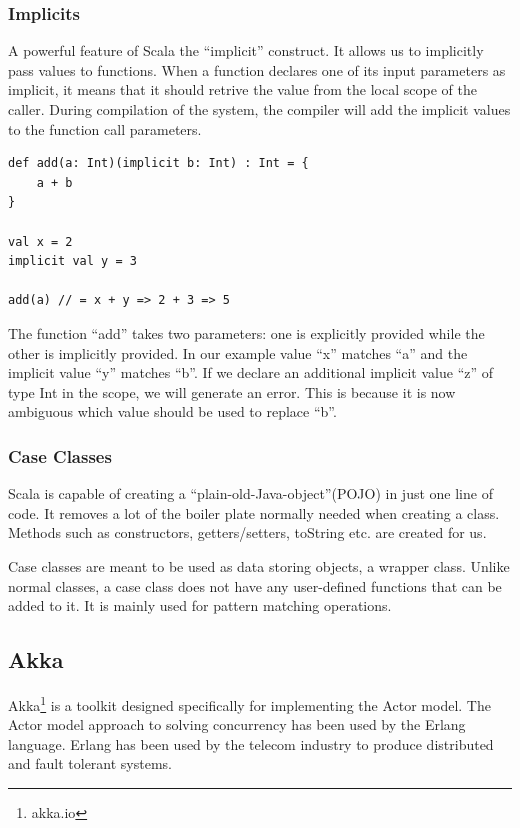 \subsubsection{Implicits}
A powerful feature of Scala the ``implicit'' construct. It allows us to implicitly pass values to functions. When a function declares one of its input parameters as implicit, it means that it should retrive the value from the local scope of the caller. During compilation of the system, the compiler will add the implicit values to the function call parameters.

\begin{lstlisting}[style=myScalastyle]
def add(a: Int)(implicit b: Int) : Int = {
    a + b
}

val x = 2
implicit val y = 3

add(a) // = x + y => 2 + 3 => 5
\end{lstlisting}
The function ``add'' takes two parameters: one is explicitly provided while the other is implicitly provided. In our example value ``x'' matches ``a'' and the implicit value ``y'' matches  ``b''. If we declare an additional implicit value ``z'' of type Int in the scope, we will generate an error. This is because it is now ambiguous which value should be used to replace ``b''. 

\subsubsection{Case Classes}
Scala is capable of creating a ``plain-old-Java-object''(POJO) in just one line of code. It removes a lot of the boiler plate normally needed when creating a class. Methods such as constructors, getters/setters, toString etc. are created for us.

Case classes are meant to be used as data storing objects, a wrapper class. Unlike normal classes, a case class does not have any user-defined functions that can be added to it. It is mainly used for pattern matching operations.

\subsection{Akka} 
Akka\footnote{akka.io}\cite{akka-documentation} is a toolkit designed specifically for implementing the Actor model. The Actor model approach to solving concurrency has been used by the Erlang language. Erlang has been used by the telecom industry to produce distributed and fault tolerant systems. 

